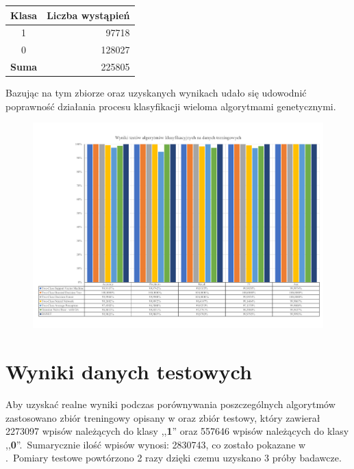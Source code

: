 \begin{table}[H]
    \centering
    \label{tab:trening-data-label}
    \begin{tabular}{|c|r|}
        \hline
        \textbf{Klasa} & \textbf{Liczba wystąpień} \\ \hline
        1              & 97718                     \\ \hline
        0              & 128027                    \\ \hline
        \textbf{Suma}  & 225805                    \\ \hline
    \end{tabular}
\end{table}

Bazując na tym zbiorze oraz uzyskanych wynikach udało się udowodnić poprawność działania procesu klasyfikacji wieloma algorytmami genetycznymi.

\begin{landscape}
    \vspace*{\fill}
    \begin{figure}[H]
        \centering
        \includegraphics[height=0.8\textwidth]{images/predict_same}
        \label{fig:predict-same}
    \end{figure}
    \vfill
\end{landscape}


\section{Wyniki danych testowych}
Aby uzyskać realne wyniki podczas porównywania poszczególnych algorytmów zastosowano zbiór treningowy opisany w  oraz zbiór testowy, który zawierał 2273097 wpisów należących do klasy ,,\textbf{1}'' oraz 557646 wpisów należących do klasy ,,\textbf{0}''.\ Sumarycznie ilość wpisów wynosi: 2830743, co zostało pokazane w .\ Pomiary testowe powtórzono 2 razy dzięki czemu uzyskano 3 próby badawcze.


